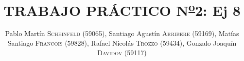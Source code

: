 \title{TRABAJO PR\'ACTICO N\textsuperscript{\underline{o}}2: Ej 8}
\author{ \newline Pablo Mart\'in  \textsc{Scheinfeld} (59065), \newline
Santiago Agustín \textsc{Arribere} (59169), \newline
Matías Santiago \textsc{Francois} (59828), \newline
Rafael Nicolás \textsc{Trozzo} (59434), \newline
Gonzalo Joaquín \textsc{Davidov} (59117)}

\date{\fecha}